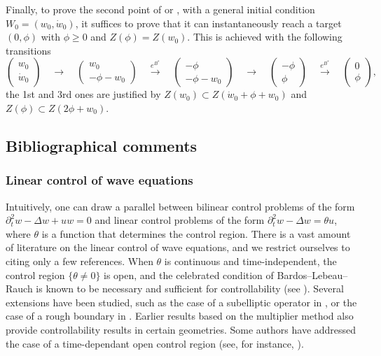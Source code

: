 \documentclass[a4paper]{article}
\theoremstyle{plain}
\begin{document}
Finally, to prove the second point of  or , with a general initial condition $W_0=(w_0,\dot{w}_0)$, it suffices to prove that it can instantaneously reach a target $(0,\phi)$ with $\phi \geq 0$ and $Z(\phi)=Z(w_0)$. This is achieved with the following transitions
$$
 \begin{pmatrix}
    w_0 \\ \dot{w}_0
\end{pmatrix}
\quad \xrightarrow[]{\quad} \quad
\begin{pmatrix}
    w_0 \\ - \phi - w_0
\end{pmatrix}
\quad \xrightarrow[]{e^{B^*}} \quad
\begin{pmatrix}
    -\phi \\ -\phi - w_0
\end{pmatrix} 
\quad \xrightarrow[]{\quad} \quad 
\begin{pmatrix}
    -\phi \\ \phi
\end{pmatrix}
\quad \xrightarrow[]{e^{B^*}} \quad 
\begin{pmatrix}
    0 \\ \phi
\end{pmatrix},
$$
the 1st and 3rd ones are justified by 
$Z(w_0) \subset Z(\dot{w}_0+\phi+w_0)$ and 
$Z(\phi) \subset Z(2\phi+w_0)$.


\subsection{Bibliographical comments}


\subsubsection{Linear control of wave equations}


Intuitively, one can draw a parallel between bilinear control problems of the form $\partial_t^2 w - \Delta w + u w = 0$ and linear control problems of the form $\partial_t^2 w - \Delta w = \theta u$, where $\theta$ is a function that determines the control region. There is a vast amount of literature on the linear control of wave equations, and we restrict ourselves to citing only a few references. When $\theta$ is continuous and time-independent, the control region $\{\theta \neq 0\}$ is open, and the celebrated condition of Bardos--Lebeau--Rauch is known to be necessary and sufficient for controllability (see \cite{BLR, BurqGerard97}). Several extensions have been studied, such as the case of a subelliptic operator in \cite{Letrouit2022,Letrouit2023}, or the case of a rough boundary in \cite{BurqLeRousseauDehman1,BurqLeRousseauDehman2}.
Earlier results based on the multiplier method also provide controllability results in certain geometries. Some authors have addressed the case of a time-dependant open control region (see, for instance, \cite{LeRousseau17}). 
    
\end{document}
